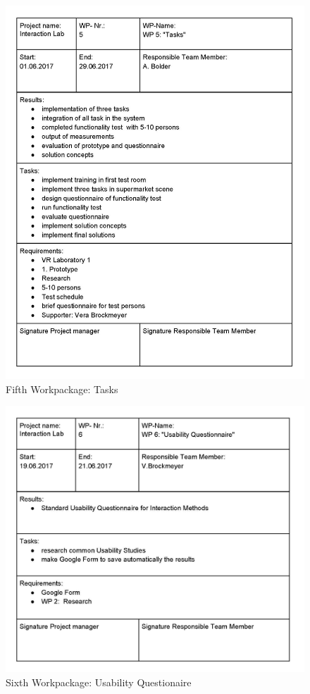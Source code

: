 \newpage
\begin{figure}[H] 
	\center 
	\includegraphics[width= 16 cm]{Images/Workpackages_Seite_5.jpg}			
	\caption[]{Fifth Workpackage: Tasks}
	\label{fig:Workpackage5}
\end{figure} 

\newpage
\begin{figure}[H] 
	\center 
	\includegraphics[width= 16 cm]{Images/Workpackages_Seite_6.jpg}			
	\caption[]{Sixth Workpackage: Usability Questionaire}
	\label{fig:Workpackage6}
\end{figure} 

